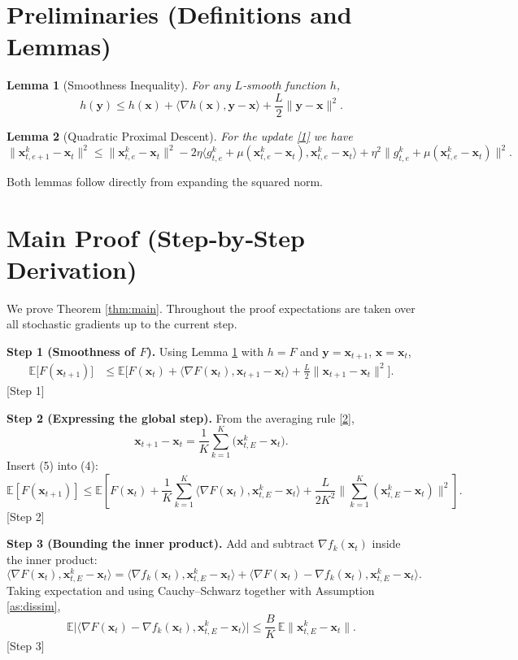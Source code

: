 \documentclass{article}
\newtheorem{lemma}{Lemma}
\begin{document}
\newpage
\section*{Preliminaries (Definitions and Lemmas)}
\begin{lemma}[Smoothness Inequality]\label{lem:smooth}
For any $L$‑smooth function $h$,
\[
h(\mathbf{y})\le h(\mathbf{x})+\langle\nabla h(\mathbf{x}),\mathbf{y}-\mathbf{x}\rangle
+\frac{L}{2}\|\mathbf{y}-\mathbf{x}\|^2 .
\]
\end{lemma}
\begin{lemma}[Quadratic Proximal Descent]\label{lem:prox}
For the update \eqref{1} we have
\[
\|\mathbf{x}^{k}_{t,e+1}-\mathbf{x}_t\|^2
\le \|\mathbf{x}^{k}_{t,e}-\mathbf{x}_t\|^2
-2\eta\langle g_{t,e}^{k}+\mu(\mathbf{x}^{k}_{t,e}-\mathbf{x}_t),
      \mathbf{x}^{k}_{t,e}-\mathbf{x}_t\rangle
+\eta^2\|g_{t,e}^{k}+\mu(\mathbf{x}^{k}_{t,e}-\mathbf{x}_t)\|^2 .
\]
\end{lemma}
Both lemmas follow directly from expanding the squared norm.

\newpage
\section*{Main Proof (Step‑by‑Step Derivation)}
We prove Theorem \ref{thm:main}. Throughout the proof expectations are taken over all stochastic gradients up to the current step.

\noindent\textbf{Step 1 (Smoothness of $F$).}  
Using Lemma \ref{lem:smooth} with $h=F$ and $\mathbf{y}=\mathbf{x}_{t+1}$, $\mathbf{x}=\mathbf{x}_t$,
\begin{align}
\mathbb{E}\big[F(\mathbf{x}_{t+1})\big]
&\le \mathbb{E}\big[F(\mathbf{x}_t)
   +\langle \nabla F(\mathbf{x}_t),\mathbf{x}_{t+1}-\mathbf{x}_t\rangle
   +\frac{L}{2}\|\mathbf{x}_{t+1}-\mathbf{x}_t\|^2\big].
\tag{4}
\end{align}
[Step 1]

\noindent\textbf{Step 2 (Expressing the global step).}  
From the averaging rule \eqref{2},
\[
\mathbf{x}_{t+1}-\mathbf{x}_t
   =\frac1K\sum_{k=1}^{K}\big(\mathbf{x}^{k}_{t,E}-\mathbf{x}_t\big).
\tag{5}
\]
Insert (5) into (4):
\[
\mathbb{E}[F(\mathbf{x}_{t+1})]
\le \mathbb{E}\!\left[
F(\mathbf{x}_t)
+\frac1K\sum_{k=1}^{K}
   \Big\langle \nabla F(\mathbf{x}_t),
          \mathbf{x}^{k}_{t,E}-\mathbf{x}_t\Big\rangle
+\frac{L}{2K^2}\Big\|\sum_{k=1}^{K}
          (\mathbf{x}^{k}_{t,E}-\mathbf{x}_t)\Big\|^2\right].
\tag{6}
\]
[Step 2]

\noindent\textbf{Step 3 (Bounding the inner product).}  
Add and subtract $\nabla f_k(\mathbf{x}_t)$ inside the inner product:
\[
\langle \nabla F(\mathbf{x}_t),\mathbf{x}^{k}_{t,E}-\mathbf{x}_t\rangle
=
\langle \nabla f_k(\mathbf{x}_t),\mathbf{x}^{k}_{t,E}-\mathbf{x}_t\rangle
+\langle \nabla F(\mathbf{x}_t)-\nabla f_k(\mathbf{x}_t),
           \mathbf{x}^{k}_{t,E}-\mathbf{x}_t\rangle .
\tag{7}
\]
Taking expectation and using Cauchy–Schwarz together with Assumption \ref{as:dissim},
\[
\mathbb{E}\Big|\langle \nabla F(\mathbf{x}_t)-\nabla f_k(\mathbf{x}_t),
           \mathbf{x}^{k}_{t,E}-\mathbf{x}_t\rangle\Big|
\le \frac{B}{K}\,\mathbb{E}\big\|\mathbf{x}^{k}_{t,E}-\mathbf{x}_t\big\|.
\tag{8}
\]
[Step 3]
\end{document}
